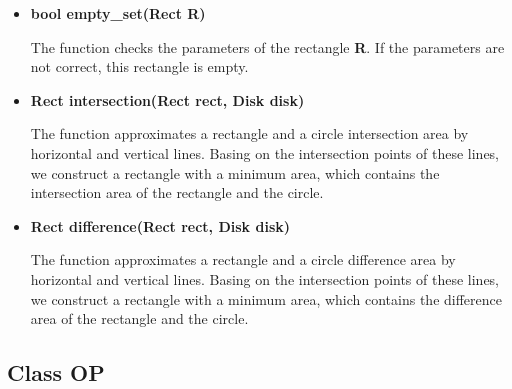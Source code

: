 \documentclass{report}
\begin{document}
\begin{itemize}
\begin{itemize}
			\item {\bfseries bool empty\_set(Rect R)}
			
			The function checks the parameters of the rectangle {\bfseries R}. If the parameters are not correct, this rectangle is empty. 
			
			
			\item {\bfseries Rect intersection(Rect rect, Disk disk)} 
			
			The function approximates a rectangle and a circle intersection area by horizontal and vertical lines. Basing on the intersection points of these lines, we construct a rectangle with a minimum area, which contains the intersection area of the rectangle and the circle.
			
			\item {\bfseries Rect difference(Rect rect, Disk disk)} 
			
			The function approximates a rectangle and a circle difference area by horizontal and vertical lines. Basing on the intersection points of these lines, we construct a rectangle with a minimum area, which contains the difference area of the rectangle and the circle.	
		\end{itemize}
	\end{itemize}

	\newpage	
	\subsection*{Class OP}
	\label{OP}
	
\end{document}
